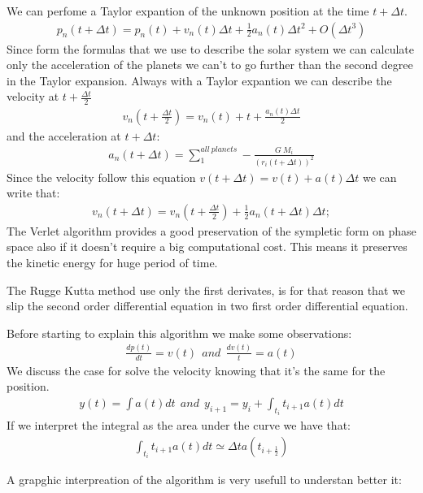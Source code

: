 \documentclass[a4paper]{article}
\begin{document}
We can perfome a Taylor expantion of the unknown position at the time $t + \Delta t$.  
\begin{align}
p_n(t + \Delta t) = p_n(t) + v_n(t)\Delta t + \frac{1}{2}a_n(t)\Delta t^2  + O(\Delta t^3) 
\end{align}
Since form the formulas that we use to describe the solar system we can calculate only the acceleration of the planets we can't  to go further than the second degree in the Taylor expansion.
Always with a Taylor expantion we can describe the velocity at $t + \frac{\Delta t}{2}$ 
\begin{align}
v_n(t + \frac{\Delta t}{2}) = v_n(t) + t + \frac{a_n(t)\Delta t}{2} 
\end{align}
and the acceleration at $t + \Delta t$:
\begin{align}
a_n(t + \Delta t) = \sum_{1}^{all \ planets} - \frac{G \ M_i}{(r_i(t + \Delta t))^2}
\end{align}
Since the velocity follow this equation $v(t + \Delta t) = v(t) + a(t)\Delta t$ we can write that:
\begin{align}
v_n(t + \Delta t) = v_n(t + \frac{\Delta t}{2}) + \frac{1}{2}a_n(t+ \Delta t)\Delta t;
\end{align}
The Verlet algorithm provides a good preservation of the sympletic form on phase space also if it doesn't require a big computational cost. This means it preserves the kinetic energy for huge period of time. 

The Rugge Kutta method use only the first derivates, is for that reason that we slip the second order differential equation in two first order differential equation. 

Before starting to explain this algorithm we make some observations: 
\begin{align}
\frac{dp(t)}{dt} = v(t) \ \ and \ \ \frac{dv(t)}{t} = a(t) 
\end{align}
We discuss the case for solve the velocity knowing that it's the same for the position.
\begin{align}
y(t) = \int a(t)dt \ \ and \  \ y_{i+1} = y_i + \int_{t_i}{t_{i+1}} a(t)dt
\end{align}
If we interpret the integral as the area under the curve we have that:
\begin{align}
\int_{t_i}{t_{i+1}} a(t)dt \simeq \Delta t a(t_{i+\frac{1}{2}})
\end{align}

A grapghic interpreation of the algorithm is very usefull to understan better it:
\end{document}
